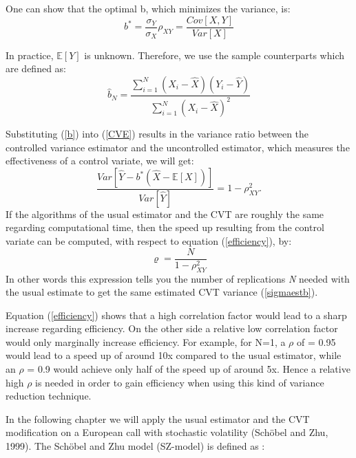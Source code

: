 \documentclass[a4paper,11pt]{article}
\begin{document}
One can show that the optimal b, which minimizes the variance, is:
\begin{equation}
b^* =  \dfrac{\sigma_Y}{\sigma_X} \rho_{XY} = \frac{Cov[X,Y]}{Var[X]}
\label{b}
\end{equation}

In practice, $\mathbb{E}[Y]$ is unknown. Therefore, we use the sample counterparts which are defined as:
\begin{equation}
\hat{b}_N =  \frac{\sum^N_{i=1} (X_i - \hat{X})(Y_i - \hat{Y})}{\sum^N_{i=1} (X_i - \hat{X})^2}
\label{bsample}
\end{equation}

Substituting (\ref{b}) into (\ref{CVE}) results in the variance ratio between the controlled variance estimator and the uncontrolled estimator, which measures the effectiveness of a control variate, we will get:
\begin{equation}
\dfrac{Var[\hat{Y} - b^*(\hat{X} - \mathbb{E}[X])]}{Var[\hat{Y}]} = 1 - \rho^2_{XY}.
\label{efficiency}
\end{equation}
If the algorithms of the usual estimator and the CVT are roughly the same regarding computational time, then the speed up resulting from the control variate can be computed, with respect to equation (\ref{efficiency}), by:
\begin{equation}
\varrho = \dfrac{N}{1 - \rho^2_{XY}} 
\label{efficiency2}
\end{equation}
In other words this expression tells you the number of replications \textit{N} needed with the usual estimate to get the same estimated CVT variance (\ref{sigmaestb}).

Equation (\ref{efficiency}) shows that a high correlation factor would  lead to a sharp increase regarding efficiency. On the other side a relative low correlation factor would only marginally increase efficiency. For example, for N=1, a $\rho$ of = 0.95 would lead to a speed up of around 10x compared to the usual estimator, while an $\rho$ = 0.9 would achieve only half of the speed up of around 5x. Hence a relative high $\rho$ is needed in order to gain efficiency when using this kind of variance reduction technique.

In the following chapter we will apply the usual estimator and the CVT modification on a European call with stochastic volatility (Sch\"obel and Zhu, 1999). The Sch\"obel and Zhu model (SZ-model) is defined as :
\end{document}
